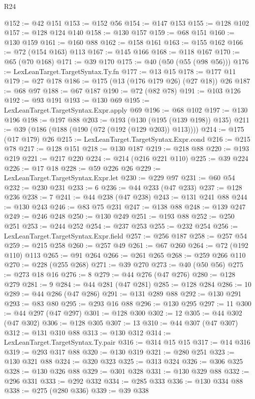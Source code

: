 \begin{lexlean}{R24}
\begin{coremodule}
@152 := @42 @151
@153 := @152 @56
@154 := @147 @153
@155 := @128 @102
@157 := @128 @124 @140
@158 := @130 @157
@159 := @68 @151
@160 := @130 @159
@161 := @160 @88
@162 := @158 @161
@163 := @155 @162
@166 := @72 (@154 @163) @113
@167 := @145 @166
@168 := @118 @167
@170 := @65 (@70 @168)
@171 := @39 @170
@175 := @40 (@50 (@55 (@98 @56)))
@176 := LexLeanTarget.TargetSyntax.Ty.fn
@177 := @13 @15
@178 := @177 @11
@179 := @27 @178
@186 := @175 (@13 (@176 @179 @26) (@27 @18)) @26
@187 := @68 @97
@188 := @67 @187
@190 := @72 (@82 @78)
@191 := @103 @126
@192 := @93 @191
@193 := @130 @69
@195 := LexLeanTarget.TargetSyntax.Expr.apply @69
@196 := @68 @102
@197 := @130 @196
@198 := @197 @88
@203 := @193 (@130 (@195 (@139 @198)) @135)
@211 := @39 (@186 (@188 (@190 (@72 (@192 (@129 @203)) @113))))
@214 := @175 (@17 @179) @26
@215 := LexLeanTarget.TargetSyntax.Expr.cond
@216 := @215 @78
@217 := @128 @151
@218 := @130 @187
@219 := @218 @88
@220 := @193 @219
@221 := @217 @220
@224 := @214 (@216 @221 @110)
@225 := @39 @224
@226 := @17 @18
@228 := @59 @226 @26
@229 := LexLeanTarget.TargetSyntax.Expr.let
@230 := @229 @97
@231 := @60 @54
@232 := @230 @231
@233 := 6
@236 := @44 @233 (@47 @233)
@237 := @128 @236
@238 := 7
@241 := @44 @238 (@47 @238)
@243 := @131 @241 @88
@244 := @130 @243
@246 := @83 @75 @231
@247 := @138 @88
@248 := @139 @247
@249 := @246 @248
@250 := @130 @249
@251 := @193 @88
@252 := @250 @251
@253 := @244 @252
@254 := @237 @253
@255 := @232 @254
@256 := LexLeanTarget.TargetSyntax.Expr.field
@257 := @256 @187
@258 := @257 @54
@259 := @215 @258
@260 := @257 @49
@261 := @67 @260
@264 := @72 (@192 @110) @113
@265 := @91 @264
@266 := @261 @265
@268 := @259 @266 @110
@270 := @228 (@255 @268)
@271 := @39 @270
@273 := @40 (@50 @56)
@275 := @273 @18 @16
@276 := 8
@279 := @44 @276 (@47 @276)
@280 := @128 @279
@281 := 9
@284 := @44 @281 (@47 @281)
@285 := @128 @284
@286 := 10
@289 := @44 @286 (@47 @286)
@291 := @131 @289 @88
@292 := @130 @291
@293 := @83 @80
@295 := @293 @16 @88
@296 := @130 @295
@297 := 11
@300 := @44 @297 (@47 @297)
@301 := @128 @300
@302 := 12
@305 := @44 @302 (@47 @302)
@306 := @128 @305
@307 := 13
@310 := @44 @307 (@47 @307)
@312 := @131 @310 @88
@313 := @130 @312
@314 := LexLeanTarget.TargetSyntax.Ty.pair
@316 := @314 @15 @15
@317 := @14 @316
@319 := @293 @317 @88
@320 := @130 @319
@321 := @280 @251
@323 := @130 @321 @88
@324 := @320 @323
@325 := @313 @324
@326 := @306 @325
@328 := @130 @326 @88
@329 := @301 @328
@331 := @130 @329 @88
@332 := @296 @331
@333 := @292 @332
@334 := @285 @333
@336 := @130 @334 @88
@338 := @275 (@280 @336)
@339 := @39 @338

\end{coremodule}
\end{lexlean}
